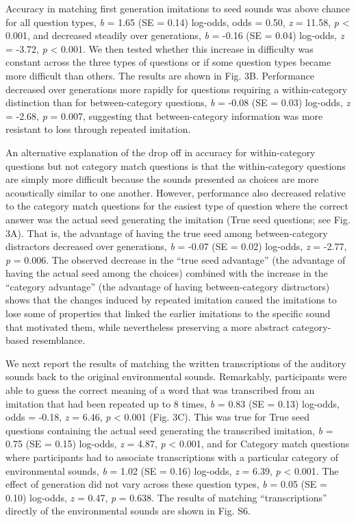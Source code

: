 \documentclass[english,floatsintext,man]{apa6}
\theoremstyle{definition}
\theoremstyle{definition}
\theoremstyle{definition}
\theoremstyle{remark}
\begin{document}
Accuracy in matching first generation imitations to seed sounds was
above chance for all question types, \emph{b} = 1.65 (SE = 0.14)
log-odds, odds = 0.50, \emph{z} = 11.58, \emph{p} \textless{} 0.001, and
decreased steadily over generations, \emph{b} = -0.16 (SE = 0.04)
log-odds, \emph{z} = -3.72, \emph{p} \textless{} 0.001. We then tested
whether this increase in difficulty was constant across the three types
of questions or if some question types became more difficult than
others. The results are shown in Fig. 3B. Performance decreased over
generations more rapidly for questions requiring a within-category
distinction than for between-category questions, \emph{b} = -0.08 (SE =
0.03) log-odds, \emph{z} = -2.68, \emph{p} = 0.007, suggesting that
between-category information was more resistant to loss through repeated
imitation.

An alternative explanation of the drop off in accuracy for
within-category questions but not category match questions is that the
within-category questions are simply more difficult because the sounds
presented as choices are more acoustically similar to one another.
However, performance also decreased relative to the category match
questions for the easiest type of question where the correct answer was
the actual seed generating the imitation (True seed questions; see Fig.
3A). That is, the advantage of having the true seed among
between-category distractors decreased over generations, \emph{b} =
-0.07 (SE = 0.02) log-odds, \emph{z} = -2.77, \emph{p} = 0.006. The
observed decrease in the \enquote{true seed advantage} (the advantage of
having the actual seed among the choices) combined with the increase in
the \enquote{category advantage} (the advantage of having
between-category distractors) shows that the changes induced by repeated
imitation caused the imitations to lose some of properties that linked
the earlier imitations to the specific sound that motivated them, while
nevertheless preserving a more abstract category-based resemblance.

We next report the results of matching the written transcriptions of the
auditory sounds back to the original environmental sounds. Remarkably,
participants were able to guess the correct meaning of a word that was
transcribed from an imitation that had been repeated up to 8 times,
\emph{b} = 0.83 (SE = 0.13) log-odds, odds = -0.18, \emph{z} = 6.46,
\emph{p} \textless{} 0.001 (Fig. 3C). This was true for True seed
questions containing the actual seed generating the transcribed
imitation, \emph{b} = 0.75 (SE = 0.15) log-odds, \emph{z} = 4.87,
\emph{p} \textless{} 0.001, and for Category match questions where
participants had to associate transcriptions with a particular category
of environmental sounds, \emph{b} = 1.02 (SE = 0.16) log-odds, \emph{z}
= 6.39, \emph{p} \textless{} 0.001. The effect of generation did not
vary across these question types, \emph{b} = 0.05 (SE = 0.10) log-odds,
\emph{z} = 0.47, \emph{p} = 0.638. The results of matching
\enquote{transcriptions} directly of the environmental sounds are shown
in Fig. S6.
\end{document}
